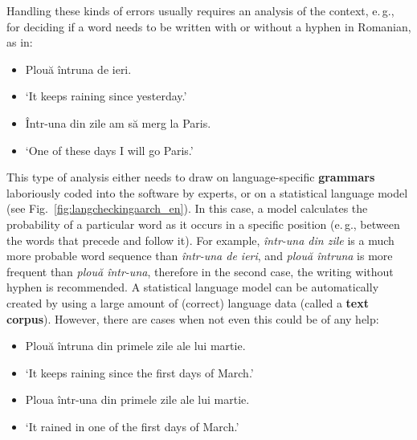 \begin{multicols}{2}
Handling these kinds of errors usually requires an analysis of the context, e.\,g., for deciding if a word needs to be written with or without a hyphen in Romanian, as in:

\begin{example}
\begin{itemize}
\item[] Plouă întruna de ieri.
\item[] `It keeps raining since yesterday.'
\end{itemize}
\end{example}

\begin{example}
\begin{itemize}
\item[] Într-una din zile am să merg la Paris.
\item[] `One of these days I will go Paris.'
\end{itemize}
\end{example}

This type of analysis either needs to draw on language-specific \textbf{grammars} laboriously coded into the software by experts, or on a  statistical language model (see Fig.~\ref{fig:langcheckingaarch_en}). In this case, a model calculates the probability of a particular word as it occurs in a specific position (e.\,g., between the words that precede and follow it). For example, \textit{într-una din zile} is a much more probable word sequence than \textit{într-una de ieri}, and \textit{plouă întruna} is more frequent than \textit{plouă într-una}, therefore in the second case, the writing without hyphen is recommended. A statistical language model can be automatically created by using a large amount of (correct) language data (called a \textbf{text corpus}). However, there are cases when not even this could be of any help:

\begin{example}
\begin{itemize}
\item []Plouă întruna din primele zile ale lui martie.
\item []`It keeps raining since the first days of March.'
\end{itemize}
\end{example}

\begin{example}
\begin{itemize}
\item []Ploua într-una din primele zile ale lui martie.
\item []`It rained in one of the first days of March.'
\end{itemize}
\end{example}


\end{multicols}

